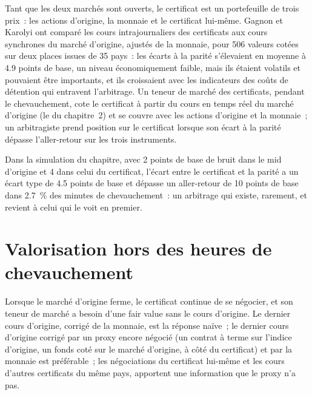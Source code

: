 Tant que les deux marchés sont ouverts, le certificat est un portefeuille de trois prix~: les actions d'origine, la monnaie et le certificat lui-même. Gagnon et Karolyi
ont comparé les cours intrajournaliers des certificats aux cours synchrones du marché d'origine, ajustés de la monnaie, pour 506 valeurs cotées sur deux places issues de 35 pays~: les écarts
à la parité s'élevaient en moyenne à 4.9 points de base, un niveau économiquement faible, mais ils étaient volatils et pouvaient être importants, et ils croissaient avec les indicateurs des coûts de détention qui
entravent l'arbitrage. Un teneur de marché des certificats, pendant le chevauchement, cote le certificat à partir du cours en temps réel du marché d'origine (le  du chapitre~2)
et se couvre avec les actions d'origine et la monnaie~; un arbitragiste prend position sur le certificat lorsque son écart à la parité dépasse l'aller-retour sur les trois instruments.

Dans la simulation du chapitre, avec 2 points de base de bruit dans le mid d'origine et 4 dans celui du certificat, l'écart entre le certificat et la parité a un
écart type de 4.5 points de base et dépasse un aller-retour de 10 points de base dans 2.7~\% des minutes de chevauchement~: un arbitrage qui existe, rarement,
et revient à celui qui le voit en premier.

\section{Valorisation hors des heures de chevauchement}

Lorsque le marché d'origine ferme, le certificat continue de se négocier, et son teneur de marché a besoin d'une fair value sans le cours d'origine. Le dernier cours d'origine, corrigé de la
monnaie, est la réponse naïve~; le dernier cours d'origine corrigé par un proxy encore négocié (un contrat à terme sur l'indice d'origine, un fonds
coté sur le marché d'origine, à côté du certificat) et par la monnaie est préférable~; les négociations du certificat lui-même et les cours d'autres certificats du même pays,
apportent une information que le proxy n'a pas.

